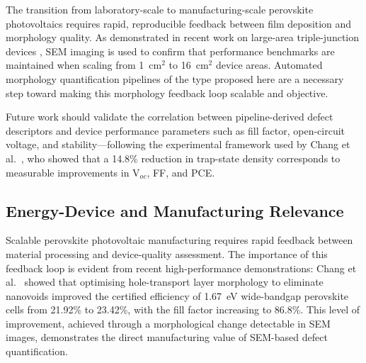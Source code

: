 \documentclass[pdflatex,sn-mathphys-num,iicol]{sn-jnl}
\theoremstyle{thmstyleone}
\theoremstyle{thmstyletwo}
\theoremstyle{thmstylethree}
\begin{document}
The transition from laboratory-scale to manufacturing-scale perovskite
photovoltaics requires rapid, reproducible feedback between film
deposition and morphology quality. As demonstrated in recent work on
large-area triple-junction devices \cite{zheng2025}, SEM imaging is
used to confirm that performance benchmarks are maintained when
scaling from 1~cm$^2$ to 16~cm$^2$ device areas. Automated morphology
quantification pipelines of the type proposed here are a necessary
step toward making this morphology feedback loop scalable and
objective.

Future work should validate the correlation between pipeline-derived
defect descriptors and device performance parameters such as fill
factor, open-circuit voltage, and stability---following the
experimental framework used by Chang et al.\ \cite{chang2026}, who
showed that a 14.8\% reduction in trap-state density corresponds to
measurable improvements in V$_{oc}$, FF, and PCE.



\subsection{Energy-Device and Manufacturing Relevance}
\label{sec:energy_relevance}

Scalable perovskite photovoltaic manufacturing requires rapid feedback
between material processing and device-quality assessment. The
importance of this feedback loop is evident from recent high-performance
demonstrations: Chang et al.\ \cite{chang2026} showed that optimising
hole-transport layer morphology to eliminate nanovoids improved the
certified efficiency of 1.67~eV wide-bandgap perovskite cells from
21.92\% to 23.42\%, with the fill factor increasing to 86.8\%. This
level of improvement, achieved through a morphological change
detectable in SEM images, demonstrates the direct manufacturing value
of SEM-based defect quantification.
\end{document}
